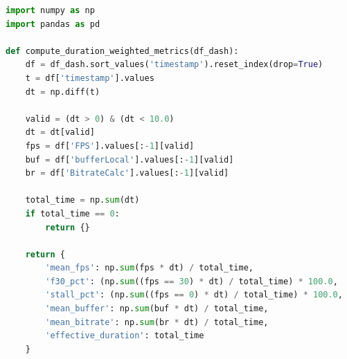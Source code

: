 \documentclass[12pt,a4paper,oneside]{report}
\begin{document}
\begin{lstlisting}[language=Python,caption={Duration-weighted QoE metric calculation engine},label={lst:duration_weighted}]
import numpy as np
import pandas as pd

def compute_duration_weighted_metrics(df_dash):
    df = df_dash.sort_values('timestamp').reset_index(drop=True)
    t = df['timestamp'].values
    dt = np.diff(t)
    
    valid = (dt > 0) & (dt < 10.0)
    dt = dt[valid]
    fps = df['FPS'].values[:-1][valid]
    buf = df['bufferLocal'].values[:-1][valid]
    br = df['BitrateCalc'].values[:-1][valid]
    
    total_time = np.sum(dt)
    if total_time == 0:
        return {}
        
    return {
        'mean_fps': np.sum(fps * dt) / total_time,
        'f30_pct': (np.sum((fps == 30) * dt) / total_time) * 100.0,
        'stall_pct': (np.sum((fps == 0) * dt) / total_time) * 100.0,
        'mean_buffer': np.sum(buf * dt) / total_time,
        'mean_bitrate': np.sum(br * dt) / total_time,
        'effective_duration': total_time
    }
\end{lstlisting}
\end{document}
